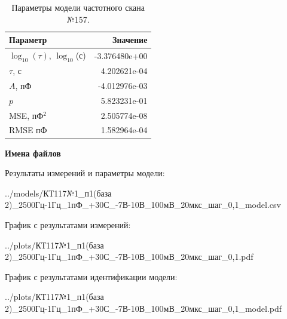 \begin{table}[!ht]
    \centering
    \caption{Параметры модели частотного скана №157.}
    \begin{tabular}{|l|r|}
        \hline
        Параметр                                       & Значение                  \\ \hline
        $\log_{10}(\tau)$, $\log_{10}$(с)              & -3.376480e+00             \\ \hline
        $\tau$, с                                      & 4.202621e-04              \\ \hline
        $A$, пФ                                        & -4.012976e-03             \\ \hline
        $p$                                            & 5.823231e-01              \\ \hline
        MSE, пФ$^2$                                    & 2.505774e-08              \\ \hline
        RMSE пФ                                        & 1.582964e-04              \\ \hline
    \end{tabular}
    \label{table:frequency_scan_model_157}
\end{table}

\textbf{Имена файлов}

Результаты измерений и параметры модели:

\scriptsize../models/КТ117№1\_п1(база 2)\_2500Гц-1Гц\_1пФ\_+30С\_-7В-10В\_100мВ\_20мкс\_шаг\_0,1\_model.csv
\normalsize

График с результатами измерений:

\scriptsize../plots/КТ117№1\_п1(база 2)\_2500Гц-1Гц\_1пФ\_+30С\_-7В-10В\_100мВ\_20мкс\_шаг\_0,1.pdf
\normalsize

График с результатами идентификации модели:

\scriptsize../plots/КТ117№1\_п1(база 2)\_2500Гц-1Гц\_1пФ\_+30С\_-7В-10В\_100мВ\_20мкс\_шаг\_0,1\_model.pdf
\normalsize

